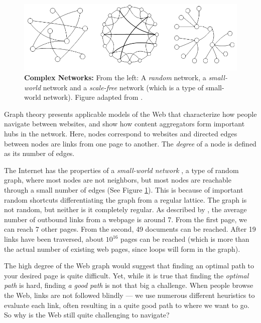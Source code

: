 \begin{figure}[t]
  \includegraphics[width=\textwidth]{../graphics/graphs}
  \caption[Complex Networks]{
    \textbf{Complex Networks:} 
    From the left: A \emph{random} network, a \emph{small-world} network and a \emph{scale-free} network 
    (which is a type of  small-world network). Figure adapted from \cite{Huang2005}.} 
  \label{fig:swn}
\end{figure}

Graph theory presents applicable models of the Web that characterize how people navigate between websites, 
and show how content aggregators form important hubs in the network. Here, nodes correspond to websites and
directed edges between nodes are links from one page to another. The \emph{degree} of a node is defined as its number of edges.

The Internet has the properties of a \emph{small-world network} \citep{Newman2000}, 
a type of random graph, where most nodes are not neighbors, but most nodes are reachable through a small number of edges (See Figure \ref{fig:swn}). 
This is because of important random shortcuts differentiating the graph from a regular lattice. 
The graph is not  random, but neither is it completely regular.
As described by \citet[p37]{Barabasi2003}, the average number of outbound links from a webpage is around 7.
From the first page, we can reach 7 other pages. From the second, 49 documents can be reached. 
After 19 links have been traversed, about $10^{16}$ pages can be reached (which is more than the actual number of existing web pages, since loops will form in the graph).

The high degree of the Web graph would suggest that finding an optimal path to your desired page is quite difficult. 
Yet, while it is true that finding the \emph{optimal path} is hard, finding \emph{a good path} is not that big a challenge. 
When people browse the Web, links are not followed blindly --- we use numerous different heuristics to evaluate each link, often resulting in a quite good path to where we want to go. 
So why is the Web still quite challenging to navigate?

